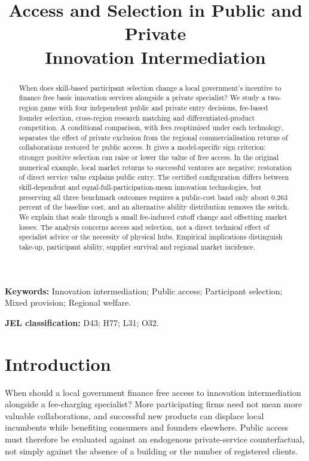 \documentclass[11pt]{article}
\title{Access and Selection in Public and Private\\ Innovation Intermediation}
\author{}
\date{}
\begin{document}
\maketitle
\begin{abstract}
When does skill-based participant selection change a local government's incentive to finance free basic innovation services alongside a private specialist? We study a two-region game with four independent public and private entry decisions, fee-based founder selection, cross-region research matching and differentiated-product competition. A conditional comparison, with fees reoptimised under each technology, separates the effect of private exclusion from the regional commercialisation returns of collaborations restored by public access. It gives a model-specific sign criterion: stronger positive selection can raise or lower the value of free access. In the original numerical example, local market returns to successful ventures are negative; restoration of direct service value explains public entry. The certified configuration differs between skill-dependent and equal-full-participation-mean innovation technologies, but preserving all three benchmark outcomes requires a public-cost band only about 0.263 percent of the baseline cost, and an alternative ability distribution removes the switch. We explain that scale through a small fee-induced cutoff change and offsetting market losses. The analysis concerns access and selection, not a direct technical effect of specialist advice or the necessity of physical hubs. Empirical implications distinguish take-up, participant ability, supplier survival and regional market incidence.
\end{abstract}
\noindent\textbf{Keywords:} Innovation intermediation; Public access; Participant selection; Mixed provision; Regional welfare.

\noindent\textbf{JEL classification:} D43; H77; L31; O32.
\doublespacing

\section{Introduction}\label{sec:intro}

When should a local government finance free access to innovation intermediation alongside a fee-charging specialist?
More participating firms need not mean more valuable collaborations, and successful new products can displace local incumbents while benefiting consumers and founders elsewhere.
Public access must therefore be evaluated against an endogenous private-service counterfactual, not simply against the absence of a building or the number of registered clients.
\end{document}
